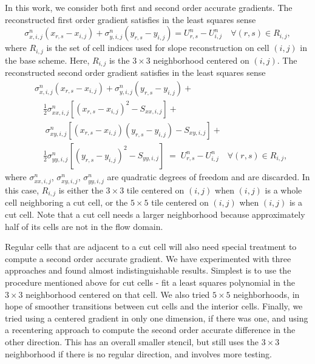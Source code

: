 In this work, we consider both first and second order accurate 
gradients.  The reconstructed first order gradient satisfies in the 
least squares sense
\begin{equation}\label{eqn:linrecon_base}
\sigma^n_{x,i,j}(x_{r,s} - x_{i,j}) +
\sigma^n_{y,i,j}(y_{r,s} - y_{i,j})=
U^n_{r,s} - U^n_{i, j} \quad \forall (r,s) \in R_{i,j},
\end{equation}
where $R_{i,j}$ is the set of cell indices used for slope reconstruction on cell $(i,j)$ in the 
base scheme.  Here, $R_{i,j}$ is the $3\times 3$ neighborhood  centered on $(i,j)$.
The reconstructed second order gradient satisfies in the least squares sense
\begin{equation}
\begin{aligned}\label{eqn:linrecon_base2}
&\sigma^n_{x,i,j}(x_{r,s} - x_{i,j}) +
\sigma^n_{y,i,j}(y_{r,s} - y_{i,j})  + \\
&\quad \frac{1}{2}\sigma^n_{xx,i,j}[(x_{r,s} - x_{i,j})^2 - S_{xx,i,j}]  + \\
& \quad \; \sigma^n_{xy,i,j}[(x_{r,s} - x_{i,j})(y_{r,s} - y_{i,j})-S_{xy,i,j}] +\\
&\quad  \frac{1}{2}\sigma^n_{yy,i,j}[(y_{r,s} - y_{i,j})^2 - S_{yy,i,j}]
 \; = \;  U^n_{r,s} - U^n_{i, j} \quad \forall (r,s) \in R_{i,j},
\end{aligned}
\end{equation}
where $\sigma^n_{xx,i,j}$, $\sigma^n_{xy,i,j}$, $\sigma^n_{yy,i,j}$ 
are quadratic degrees of freedom and are discarded.  In this case, $R_{i,j}$ is either the $3\times 3$ tile centered on $(i,j)$ when $(i,j)$ is a whole cell neighboring a cut cell, or the $5\times 5$ tile centered on $(i,j)$ when $(i,j)$ is a cut cell.
Note that a cut cell needs a larger neighborhood because 
approximately half of its cells are not in the flow domain.  

Regular cells that are adjacent to a cut cell will also need special treatment to
compute a second order accurate gradient. We have experimented with three  approaches
and found almost indistinguishable results. Simplest is to use the 
procedure mentioned above for cut cells
- fit a least squares polynomial in the $3 \times 3$ neighborhood centered on that cell.
We also tried $5 \times 5$ neighborhoods, in hope of smoother transitions between cut cells
and the interior cells.  Finally, we tried using a centered
gradient in only one dimension, if there was one, and using a recentering approach to 
compute the second order accurate difference in the other direction.  This has an overall
smaller stencil, but still uses the $3 \times 3$ neighborhood
if there is no regular direction,
and involves more testing.  

